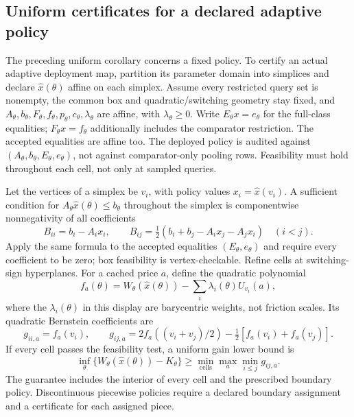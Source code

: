 \subsection{Uniform certificates for a declared adaptive policy}\label{sec:adaptiveuniform}
The preceding uniform corollary concerns a fixed policy. To certify an actual adaptive deployment map, partition its parameter domain into simplices and declare $\widehat x(\theta)$ affine on each simplex. Assume every restricted query set is nonempty, the common box and quadratic/switching geometry stay fixed, and $A_\theta,b_\theta,F_\theta,f_\theta,p_\theta,c_\theta,\lambda_\theta$ are affine, with $\lambda_\theta\geq0$. Write $E_\theta x=e_\theta$ for the full-class equalities; $F_\theta x=f_\theta$ additionally includes the comparator restriction. The accepted equalities are affine too. The deployed policy is audited against $(A_\theta,b_\theta,E_\theta,e_\theta)$, not against comparator-only pooling rows. Feasibility must hold throughout each cell, not only at sampled queries.
\begin{proposition}\label{prop:adaptiveuniform}
Let the vertices of a simplex be $v_i$, with policy values $x_i=\widehat x(v_i)$. A sufficient condition for $A_\theta\widehat x(\theta)\leq b_\theta$ throughout the simplex is componentwise nonnegativity of all coefficients
\begin{equation}\label{eq:bernsteinfeas}
 B_{ii}=b_i-A_ix_i,\qquad
 B_{ij}=\tfrac12(b_i+b_j-A_ix_j-A_jx_i)\quad(i<j).
\end{equation}
Apply the same formula to the accepted equalities $(E_\theta,e_\theta)$ and require every coefficient to be zero; box feasibility is vertex-checkable. Refine cells at switching-sign hyperplanes. For a cached price $a$, define the quadratic polynomial
\[
 f_a(\theta)=W_\theta(\widehat x(\theta))-\sum_i\lambda_i(\theta)U_{v_i}(a),
\]
where the $\lambda_i(\theta)$ in this display are barycentric weights, not friction scales. Its quadratic Bernstein coefficients are
\[
 g_{ii,a}=f_a(v_i),\qquad
 g_{ij,a}=2f_a((v_i+v_j)/2)-\tfrac12[f_a(v_i)+f_a(v_j)].
\]
If every cell passes the feasibility test, a uniform gain lower bound is
\begin{equation}\label{eq:adaptivegain}
 \inf_\theta\{W_\theta(\widehat x(\theta))-K_\theta\}
 \geq \min_{\text{cells}}\max_a\min_{i\leq j}g_{ij,a}.
\end{equation}
The guarantee includes the interior of every cell and the prescribed boundary policy. Discontinuous piecewise policies require a declared boundary assignment and a certificate for each assigned piece.
\end{proposition}
